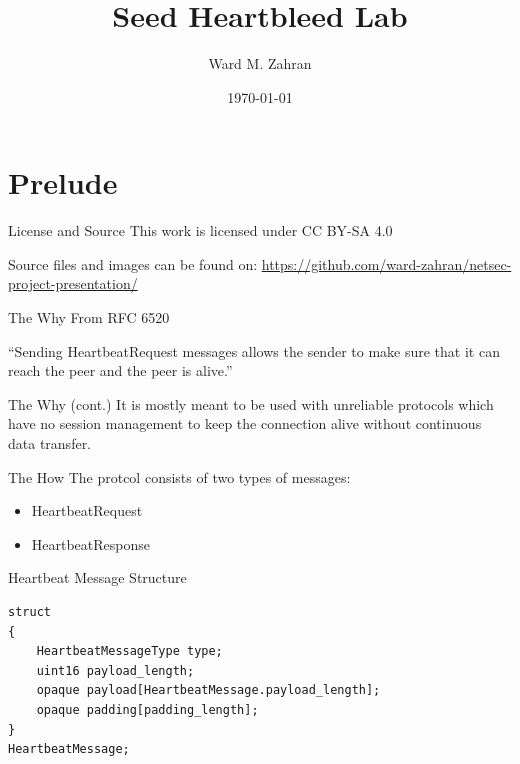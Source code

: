 \documentclass{beamer}
\title{Seed Heartbleed Lab}
\date{\today}
\author{Ward M. Zahran}
\institute{University of Jordan}
\begin{document}
\maketitle
\section{Prelude}

\begin{frame}{License and Source}
    This work is licensed under CC BY-SA 4.0

    Source files and images can be found on:
    \href{https://github.com/ward-zahran/netsec-project-presentation/}{https://github.com/ward-zahran/netsec-project-presentation/}


\end{frame}

\begin{frame}{The Why}
    From RFC 6520

    ``Sending HeartbeatRequest messages allows the sender to make sure that it can reach the peer and the peer is alive.''

\end{frame}

\begin{frame}{The Why (cont.)}
    It is mostly meant to be used with unreliable protocols which have no session management
    to keep the connection alive without continuous data transfer.
\end{frame}

\begin{frame}{The How}
    The protcol consists of two types of messages:
    \begin{itemize}
        \item HeartbeatRequest
        \item HeartbeatResponse
    \end{itemize}
\end{frame}


\begin{frame}[fragile]{Heartbeat Message Structure}
    \begin{verbatim}
struct
{
    HeartbeatMessageType type;
    uint16 payload_length;
    opaque payload[HeartbeatMessage.payload_length];
    opaque padding[padding_length];
}
HeartbeatMessage;

    \end{verbatim}


\end{frame}
\end{document}
